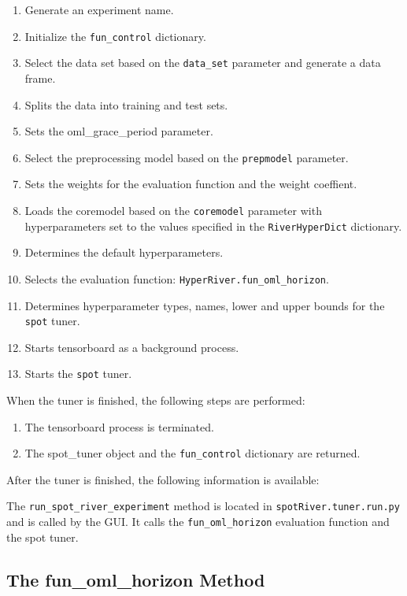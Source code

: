\documentclass[
  letterpaper,
  DIV=11,
  numbers=noendperiod]{scrreprt}
\providecommand{\tightlist}{%
  \setlength{\itemsep}{0pt}\setlength{\parskip}{0pt}}\usepackage{longtable,booktabs,array}
\begin{document}
\begin{enumerate}
\def\labelenumi{\arabic{enumi}.}
\tightlist
\item
  Generate an experiment name.
\item
  Initialize the \texttt{fun\_control} dictionary.
\item
  Select the data set based on the \texttt{data\_set} parameter and
  generate a data frame.
\item
  Splits the data into training and test sets.
\item
  Sets the oml\_grace\_period parameter.
\item
  Select the preprocessing model based on the \texttt{prepmodel}
  parameter.
\item
  Sets the weights for the evaluation function and the weight coeffient.
\item
  Loads the coremodel based on the \texttt{coremodel} parameter with
  hyperparameters set to the values specified in the
  \texttt{RiverHyperDict} dictionary.
\item
  Determines the default hyperparameters.
\item
  Selects the evaluation function:
  \texttt{HyperRiver.fun\_oml\_horizon}.
\item
  Determines hyperparameter types, names, lower and upper bounds for the
  \texttt{spot} tuner.
\item
  Starts tensorboard as a background process.
\item
  Starts the \texttt{spot} tuner.
\end{enumerate}

When the tuner is finished, the following steps are performed:

\begin{enumerate}
\def\labelenumi{\arabic{enumi}.}
\tightlist
\item
  The tensorboard process is terminated.
\item
  The spot\_tuner object and the \texttt{fun\_control} dictionary are
  returned.
\end{enumerate}

After the tuner is finished, the following information is available:

The \texttt{run\_spot\_river\_experiment} method is located in
\texttt{spotRiver.tuner.run.py} and is called by the GUI. It calls the
\texttt{fun\_oml\_horizon} evaluation function and the spot tuner.

\subsection{The fun\_oml\_horizon
Method}\label{the-fun_oml_horizon-method}
\end{document}

